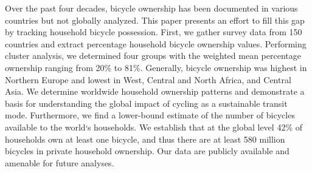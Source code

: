 Over the past four decades, bicycle ownership has been documented in various countries but not globally analyzed. This paper presents an effort to fill this gap by tracking household bicycle possession. First, we gather survey data from 150 countries and extract percentage household bicycle ownership values. Performing cluster analysis, we determined four groups with the weighted mean percentage ownership ranging from 20\% to 81\%. Generally, bicycle ownership was highest in Northern Europe and lowest in West, Central and North Africa, and Central Asia. We determine worldwide household ownership patterns and demonstrate a basis for understanding the global impact of cycling as a sustainable transit mode. Furthermore, we find a lower-bound estimate of the number of bicycles available to the world׳s households. We establish that at the global level 42\% of households own at least one bicycle, and thus there are at least 580 million bicycles in private household ownership. Our data are publicly available and amenable for future analyses.

